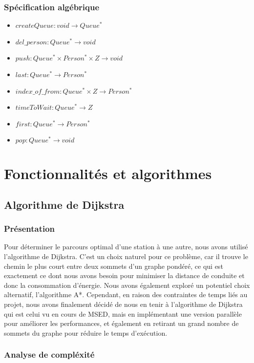 \documentclass[french,a4paper]{article}
\begin{document}
\subsubsection{Spécification algébrique}
\begin{itemize}
    \item $createQueue : void \rightarrow Queue^*$
    \item $del\_person : Queue^* \rightarrow void$
    \item $push : Queue^* \times Person^* \times {Z} \rightarrow void$
    \item $last : Queue^* \rightarrow Person^*$
    \item $index\_of\_from : Queue^* \times {Z} \rightarrow Person^*$
    \item $timeToWait : Queue^* \rightarrow {Z}$
    \item $first : Queue^* \rightarrow Person^*$
    \item $pop : Queue^* \rightarrow void$
\end{itemize}

\section{Fonctionnalités et algorithmes}
\subsection{Algorithme de Dijkstra}
\subsubsection{Présentation}
Pour déterminer le parcours optimal d'une station à une autre, nous avons utilisé l'algorithme de Dijkstra. C'est un choix naturel pour ce problème, 
car il trouve le chemin le plus court entre deux sommets d'un graphe pondéré, ce qui est exactement ce dont nous avons besoin pour minimiser 
la distance de conduite et donc la consommation d'énergie. Nous avons également exploré un potentiel choix alternatif, l'algorithme A*. Cependant, en 
raison des contraintes de temps liés au projet, nous avons finalement décidé de nous en tenir à l'algorithme de Dijkstra qui est celui vu en cours de 
MSED, mais en implémentant une version parallèle pour améliorer les performances, et également 
en retirant un grand nombre de sommets du graphe pour réduire le temps d'exécution.

\subsubsection{Analyse de compléxité}
\end{document}
